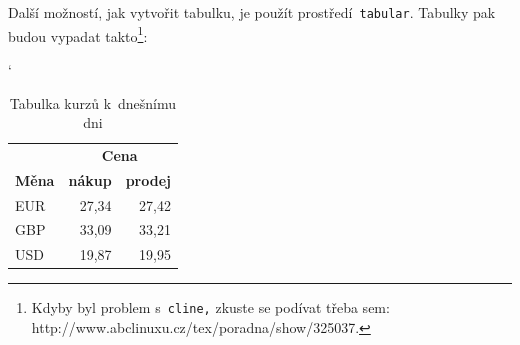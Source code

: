 \documentclass[a4paper, 11pt]{article}
\begin{document}
Další možností, jak vytvořit tabulku, je použít prostředí\texttt{ tabular}. Tabulky pak 
budou vypadat takto\footnote{Kdyby byl problem s\texttt{ cline,} zkuste se podívat třeba sem: 
{http://www.abclinuxu.cz/tex/poradna/show/325037}.}:

\bigskip
\begin{table}[ht]
	\begin{center} \catcode`
		\begin{tabular}{|l|r|r|}
		\hline
		&\multicolumn{2}{|c|}{\textbf{Cena}}\\ \cline{2-3}
		\textbf{Měna} & \textbf{nákup} & \textbf{prodej} \\
		\hline
		EUR & 27,34 & 27,42 \\
		GBP & 33,09 & 33,21 \\
		USD & 19,87 & 19,95 \\
		\hline
		\end{tabular}
		\caption{Tabulka kurzů k~dnešnímu dni}
		\label{tab1}
	\end{center}
\end{table}
\end{document}
